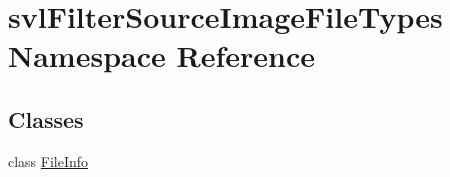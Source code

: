 \hypertarget{namespacesvl_filter_source_image_file_types}{}\section{svl\+Filter\+Source\+Image\+File\+Types Namespace Reference}
\label{namespacesvl_filter_source_image_file_types}
\subsection*{Classes}
\begin{DoxyCompactItemize}
\item 
class \hyperlink{classsvl_filter_source_image_file_types_1_1_file_info}{File\+Info}
\end{DoxyCompactItemize}

